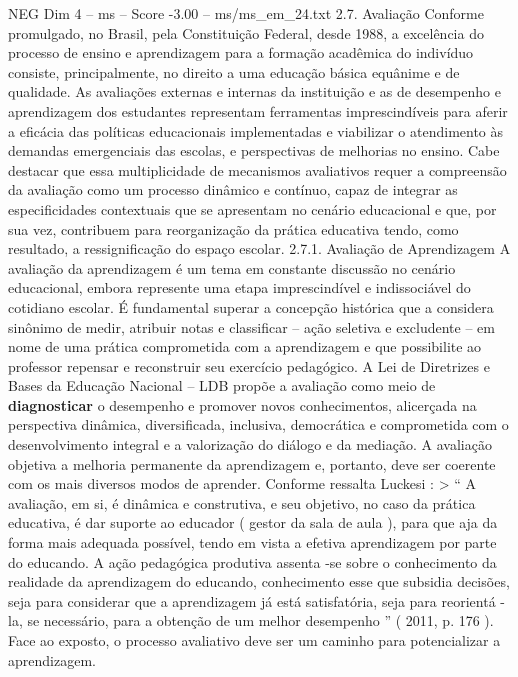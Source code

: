 \begin{textsample}{NEG Dim 4 – ms – Score -3.00 – ms/ms\_em\_24.txt}  \label{ex:f4_neg_132}
2.7.
Avaliação Conforme promulgado, no Brasil, pela Constituição Federal, desde 1988, a excelência do processo de ensino e aprendizagem para a formação acadêmica do indivíduo consiste, principalmente, no direito a uma educação básica equânime e de qualidade.
As avaliações externas e internas da instituição e as de desempenho e aprendizagem dos estudantes representam ferramentas imprescindíveis para aferir a eficácia das políticas educacionais implementadas e viabilizar o atendimento às demandas emergenciais das escolas, e perspectivas de melhorias no ensino.
Cabe destacar que essa multiplicidade de mecanismos avaliativos requer a compreensão da avaliação como um processo dinâmico e contínuo, capaz de integrar as especificidades contextuais que se apresentam no cenário educacional e que, por sua vez, contribuem para reorganização da prática educativa tendo, como resultado, a ressignificação do espaço escolar. 2.7.1.
Avaliação de Aprendizagem A avaliação da aprendizagem é um tema em constante discussão no cenário educacional, embora represente uma etapa imprescindível e indissociável do cotidiano escolar.
É fundamental superar a concepção histórica que a considera sinônimo de medir, atribuir notas e classificar – ação seletiva e excludente – em nome de uma prática comprometida com a aprendizagem e que possibilite ao professor repensar e reconstruir seu exercício pedagógico.
A Lei de Diretrizes e Bases da Educação Nacional – LDB propõe a avaliação como meio de \textbf{diagnosticar} o desempenho e promover novos conhecimentos, alicerçada na perspectiva dinâmica, diversificada, inclusiva, democrática e comprometida com o desenvolvimento integral e a valorização do diálogo e da mediação.
A avaliação objetiva a melhoria permanente da aprendizagem e, portanto, deve ser coerente com os mais diversos modos de aprender.
Conforme ressalta Luckesi : > “ A avaliação, em si, é dinâmica e construtiva, e seu objetivo, no caso da prática educativa, é dar suporte ao educador ( gestor da sala de aula ), para que aja da forma mais adequada possível, tendo em vista a efetiva aprendizagem por parte do educando.
A ação pedagógica produtiva assenta -se sobre o conhecimento da realidade da aprendizagem do educando, conhecimento esse que subsidia decisões, seja para considerar que a aprendizagem já está satisfatória, seja para reorientá -la, se necessário, para a obtenção de um melhor desempenho ” ( 2011, p. 176 ).
Face ao exposto, o processo avaliativo deve ser um caminho para potencializar a aprendizagem.

\end{textsample}
